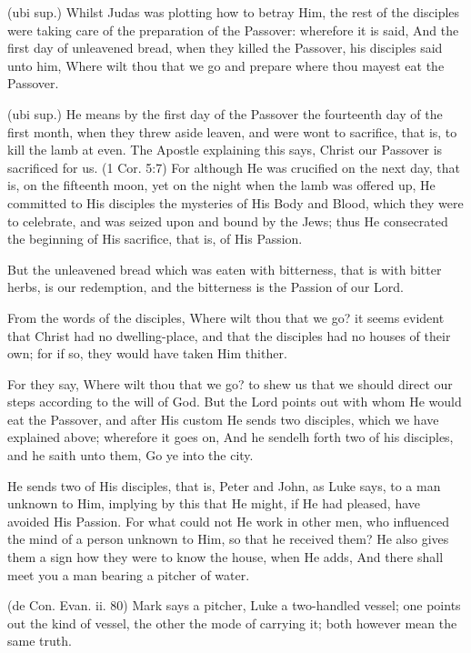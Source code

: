  (ubi sup.) Whilst Judas was plotting how to betray Him, the rest of the disciples were taking care of the preparation of the Passover: wherefore it is said, And the first day of unleavened bread, when they killed the Passover, his disciples said unto him, Where wilt thou that we go and prepare where thou mayest eat the Passover.

 (ubi sup.) He means by the first day of the Passover the fourteenth day of the first month, when they threw aside leaven, and were wont to sacrifice, that is, to kill the lamb at even. The Apostle explaining this says, Christ our Passover is sacrificed for us. (1 Cor. 5:7) For although He was crucified on the next day, that is, on the fifteenth moon, yet on the night when the lamb was offered up, He committed to His disciples the mysteries of His Body and Blood, which they were to celebrate, and was seized upon and bound by the Jews; thus He consecrated the beginning of His sacrifice, that is, of His Passion.

 But the unleavened bread which was eaten with bitterness, that is with bitter herbs, is our redemption, and the bitterness is the Passion of our Lord.

 From the words of the disciples, Where wilt thou that we go? it seems evident that Christ had no dwelling-place, and that the disciples had no houses of their own; for if so, they would have taken Him thither.

 For they say, Where wilt thou that we go? to shew us that we should direct our steps according to the will of God. But the Lord points out with whom He would eat the Passover, and after His custom He sends two disciples, which we have explained above; wherefore it goes on, And he sendelh forth two of his disciples, and he saith unto them, Go ye into the city.

 He sends two of His disciples, that is, Peter and John, as Luke says, to a man unknown to Him, implying by this that He might, if He had pleased, have avoided His Passion. For what could not He work in other men, who influenced the mind of a person unknown to Him, so that he received them? He also gives them a sign how they were to know the house, when He adds, And there shall meet you a man bearing a pitcher of water.

 (de Con. Evan. ii. 80) Mark says a pitcher, Luke a two-handled vessel; one points out the kind of vessel, the other the mode of carrying it; both however mean the same truth.

